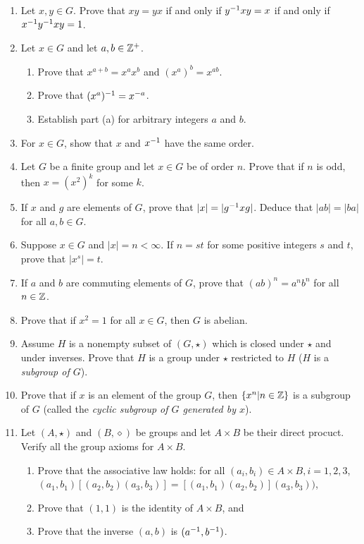 \begin{enumerate}
		\item Let $x,y\in G$.  Prove that $xy = yx$ if and only if $y^{-1} x y = x$ if and only if $x^{-1} y^{-1} xy = 1$.
		\item Let $x\in G$ and let $a,b \in\mathbb{Z}^+$.
		\begin{enumerate}
			\item Prove that $x^{a+b} = x^ax^b$ and $(x^a)^b = x^{ab}$.
			\item Prove that $(x^a)^{-1} = x^{-a}$.
			\item Establish part (a) for arbitrary integers $a$ and $b$.
		\end{enumerate}
		\item For $x\in G$, show that $x$ and $x^{-1}$ have the same order.
		\item Let $G$ be a finite group and let $x\in G$ be of order $n$.  Prove that if $n$ is odd, then $x = (x^2)^k$ for some $k$.
		\item If $x$ and $g$ are elements of $G$, prove that $|x|=|g^{-1} xg|$.  Deduce that $|ab| = |ba|$ for all $a,b\in G$.
		\item Suppose $x\in G$ and $|x| = n<\infty$.  If $n=st$ for some positive integers $s$ and $t$, prove that $|x^s| = t$.
		\item If $a$ and $b$ are commuting elements of $G$, prove that $(ab)^n = a^nb^n$ for all $n\in \mathbb{Z}$.
		\item Prove that if $x^2 = 1$ for all $x\in G$, then $G$ is abelian.
		\item Assume $H$ is a nonempty subset of $(G,\star)$ which is closed under $\star$ and under inverses.  Prove that $H$ is a group under $\star$ restricted to $H$ ($H$ is a \emph{subgroup of $G$}).
		\item Prove that if $x$ is an element of the group $G$, then $\left\{ x^n|n\in\mathbb{Z} \right\}$ is a subgroup of $G$ (called the \emph{cyclic subgroup of $G$ generated by $x$}).
		\item Let $(A,\star)$ and $(B,\diamond)$ be groups and let $A\times B$ be their direct procuct.  Verify all the group axioms for $A\times B$.
		\begin{enumerate}
			\item Prove that the associative law holds: for all $(a_i,b_i)\in A\times B, i = 1,2,3$, \\$(a_1,b_1)[(a_2,b_2)(a_3,b_3)] = [(a_1,b_1)(a_2,b_2)](a_3,b_3))$,
			\item Prove that $(1,1)$ is the identity of $A\times B$, and
			\item Prove that the inverse $(a,b)$ is $(a^{-1},b^{-1})$.

\end{enumerate}
\end{enumerate}
